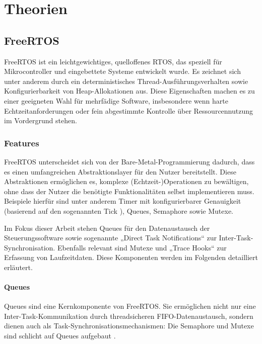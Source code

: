 \section{Theorien}

\subsection{FreeRTOS}

FreeRTOS ist ein leichtgewichtiges, quelloffenes RTOS, das speziell für
Mikrocontroller und eingebettete Systeme entwickelt wurde. Es zeichnet sich
unter anderem durch ein deterministisches Thread-Ausführungsverhalten sowie
Konfigurierbarkeit von Heap-Allokationen aus. Diese Eigenschaften machen es zu
einer geeigneten Wahl für mehrfädige Software, insbesondere wenn harte
Echtzeitanforderungen \cite{freertos_tutorial} oder fein abgestimmte Kontrolle
über Ressourcennutzung im Vordergrund stehen.

\subsubsection{Features}

FreeRTOS unterscheidet sich von der Bare-Metal-Programmierung dadurch, dass es
einen umfangreichen Abstraktionslayer für den Nutzer bereitstellt. Diese
Abstraktionen ermöglichen es, komplexe (Echtzeit-)Operationen zu bewältigen,
ohne dass der Nutzer die benötigte Funktionalitäten selbst implementieren muss.
Beispiele hierfür sind unter anderem Timer mit konfigurierbarer Genauigkeit
(basierend auf den sogenannten Tick \cite{freertos_rtos_tick}), Queues,
Semaphore sowie Mutexe.

Im Fokus dieser Arbeit stehen Queues für den Datenaustausch der
Steuerungssoftware sowie sogenannte „Direct Task Notifications“ zur
Inter-Task-Synchronisation. Ebenfalls relevant sind Mutexe und „Trace Hooks“ zur
Erfassung von Laufzeitdaten. Diese Komponenten werden im Folgenden detailliert
erläutert.

\paragraph{Queues}

Queues sind eine Kernkomponente von FreeRTOS. Sie ermöglichen nicht nur eine
Inter-Task-Kommunikation durch threadsicheren FIFO-Datenaustausch, sondern
dienen auch als Task-Synchronisationsmechanismen: Die Semaphore und Mutexe sind
schlicht auf Queues aufgebaut \cite{freertos_semphr_incl, freertos_queue_mtx}.

